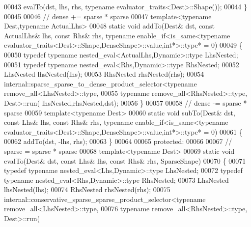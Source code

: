 \begin{DoxyCode}
00043     evalTo(dst, lhs, rhs, \textcolor{keyword}{typename} evaluator\_traits<Dest>::Shape());
00044   \}
00045 
00046   \textcolor{comment}{// dense += sparse * sparse}
00047   \textcolor{keyword}{template}<\textcolor{keyword}{typename} Dest,\textcolor{keyword}{typename} ActualLhs>
00048   \textcolor{keyword}{static} \textcolor{keywordtype}{void} addTo(Dest& dst, \textcolor{keyword}{const} ActualLhs& lhs, \textcolor{keyword}{const} Rhs& rhs, \textcolor{keyword}{typename} enable\_if<is\_same<\textcolor{keyword}{typename} 
      evaluator\_traits<Dest>::Shape,DenseShape>::value,\textcolor{keywordtype}{int}*>::type* = 0)
00049   \{
00050     \textcolor{keyword}{typedef} \textcolor{keyword}{typename} nested\_eval<ActualLhs,Dynamic>::type LhsNested;
00051     \textcolor{keyword}{typedef} \textcolor{keyword}{typename} nested\_eval<Rhs,Dynamic>::type RhsNested;
00052     LhsNested lhsNested(lhs);
00053     RhsNested rhsNested(rhs);
00054     internal::sparse\_sparse\_to\_dense\_product\_selector<typename remove\_all<LhsNested>::type,
00055                                                       \textcolor{keyword}{typename} remove\_all<RhsNested>::type, Dest>::run(
      lhsNested,rhsNested,dst);
00056   \}
00057 
00058   \textcolor{comment}{// dense -= sparse * sparse}
00059   \textcolor{keyword}{template}<\textcolor{keyword}{typename} Dest>
00060   \textcolor{keyword}{static} \textcolor{keywordtype}{void} subTo(Dest& dst, \textcolor{keyword}{const} Lhs& lhs, \textcolor{keyword}{const} Rhs& rhs, \textcolor{keyword}{typename} enable\_if<is\_same<\textcolor{keyword}{typename} 
      evaluator\_traits<Dest>::Shape,DenseShape>::value,\textcolor{keywordtype}{int}*>::type* = 0)
00061   \{
00062     addTo(dst, -lhs, rhs);
00063   \}
00064 
00065 \textcolor{keyword}{protected}:
00066 
00067   \textcolor{comment}{// sparse = sparse * sparse}
00068   \textcolor{keyword}{template}<\textcolor{keyword}{typename} Dest>
00069   \textcolor{keyword}{static} \textcolor{keywordtype}{void} evalTo(Dest& dst, \textcolor{keyword}{const} Lhs& lhs, \textcolor{keyword}{const} Rhs& rhs, SparseShape)
00070   \{
00071     \textcolor{keyword}{typedef} \textcolor{keyword}{typename} nested\_eval<Lhs,Dynamic>::type LhsNested;
00072     \textcolor{keyword}{typedef} \textcolor{keyword}{typename} nested\_eval<Rhs,Dynamic>::type RhsNested;
00073     LhsNested lhsNested(lhs);
00074     RhsNested rhsNested(rhs);
00075     internal::conservative\_sparse\_sparse\_product\_selector<typename remove\_all<LhsNested>::type,
00076                                                           \textcolor{keyword}{typename} remove\_all<RhsNested>::type, Dest>::run(

\end{DoxyCode}
